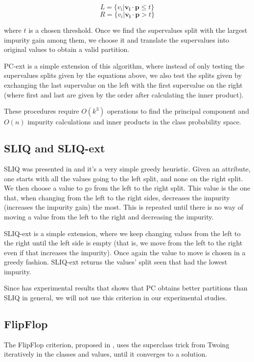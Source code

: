 $$L = \{v_i | \mathbf{v_i} \cdot \mathbf{p} \leq t\}$$
$$R = \{v_i | \mathbf{v_i} \cdot \mathbf{p} > t\}$$

where $t$ is a chosen threshold. Once we find the supervalues split with the largest impurity gain among them, we choose it and translate the supervalues into original values to obtain a valid partition.

PC-ext is a simple extension of this algorithm, where instead of only testing the supervalues splits given by the equations above, we also test the splits given by  exchanging the last supervalue on the left with the first supervalue on the right (where first and last are given by the order after calculating the inner product).

These procedures require $O(k^3)$ operations to find the principal component and $O(n)$ impurity calculations and inner products in the class probability space.


\subsection{SLIQ and SLIQ-ext}
SLIQ was presented in \cite{mehta1996sliq} and it's a very simple greedy heuristic. Given an attribute, one starts with all the values going to the left split, and none on the right split. We then choose a value to go from the left to the right split. This value is the one that, when changing from the left to the right sides, decreases the impurity (increases the impurity gain) the most. This is repeated until there is no way of moving a value from the left to the right and decreasing the impurity.

SLIQ-ext is a simple extension, where we keep changing values from the left to the right until the left side is empty (that is, we move from the left to the right even if that increases the impurity). Once again the value to move is chosen in a greedy fashion. SLIQ-ext returns the values' split seen that had the lowest impurity.

Since \cite{journals/datamine/CoppersmithHH99} has experimental results that shows that PC obtains better partitions than SLIQ in general, we will not use this criterion in our experimental studies.


\subsection{FlipFlop}

The FlipFlop criterion, proposed in \cite{nadas1991iterative}, uses the superclass trick from Twoing iteratively in the classes and values, until it converges to a solution.



